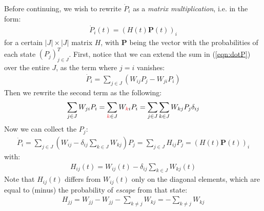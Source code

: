 \documentclass[../template.tex]{subfiles}
\begin{document}
\begin{exo}
    Before continuing, we wish to rewrite $\dot{P}_i$ as a \textit{matrix multiplication}, i.e. in the form:
    \begin{align*}
        \dot{P}_i(t) = (H(t)\bm{P}(t))_i
    \end{align*} 
    for a certain $|J| \times |J|$ matrix $H$, with $\bm{P}$ being the vector with the probabilities of each state $(P_j)^T_{j \in J}$. First, notice that we can extend the sum in (\ref{eqn:dotP}) over the entire $J$, as the term where $j=i$ vanishes:
    \begin{align*}
        \dot{P}_i = \sum_{j \in J} (W_{ij}P_j - W_{ji} P_i)
    \end{align*}
    Then we rewrite the second term as the following:
    \begin{align*}
        \sum_{j \in J} W_{ji} P_i =  \sum_{\textcolor{Red}{k} \in J} W_{\textcolor{Red}{k}i}P_i = \sum_{j \in J} \sum_{k \in J} W_{kj} P_j \delta_{ij}
    \end{align*}
    Now we can collect the $P_j$:
    \begin{align} \label{eqn:evolution-formula}
        \dot{P}_i = \sum_{j \in J} \left(W_{ij} - \delta_{ij} \sum_{k \in J} W_{kj}\right) P_j = \sum_{j \in J} H_{ij} P_j = (H(t)\bm{P}(t))_i
    \end{align}
    with:
    \begin{align*}
        H_{ij}(t) = W_{ij}(t) - \delta_{ij} \sum_{k \in J} W_{kj}(t)
    \end{align*}
    Note that $H_{ij}(t)$ differs from $W_{ij}(t)$ only on the diagonal elements, which are equal to (minus) the probability of \textit{escape} from that state:
    \begin{align*}
        H_{j j} = W_{j j} - W_{jj} - \sum_{k \neq j} W_{k j} = -\sum_{k \neq j} W_{kj}
    \end{align*} 


\end{exo}
\end{document}
